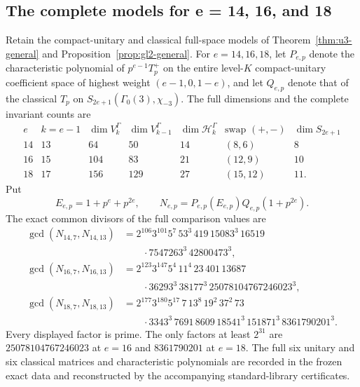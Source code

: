 \subsection{The complete models for e = 14, 16, and 18}
\label{sec:u3-higher2}

\begin{proposition}\label{prop:hecke-higher2}
Retain the compact-unitary and classical full-space models of
Theorem~\ref{thm:u3-general} and Proposition~\ref{prop:gl2-general}.
For \(e=14,16,18\), let \(P_{e,p}\) denote the characteristic polynomial
of \(p^{e-1}T_p^+\) on the entire level-\(K\) compact-unitary coefficient
space of highest weight \((e-1,0,1-e)\), and let \(Q_{e,p}\) denote that
of the classical \(T_p\) on
\(S_{2e+1}(\Gamma_0(3),\chi_{-3})\).
The full dimensions and the complete invariant counts are
\[
\begin{array}{c|c|r|r|r|c|r}
e&k=e-1&\dim V_k^\Gamma&\dim V_{k-1}^\Gamma&
\dim\mathcal H_k^\Gamma&\text{swap }(+,-)&\dim S_{2e+1}\\ \hline
14&13&64&50&14&(8,6)&8\\
16&15&104&83&21&(12,9)&10\\
18&17&156&129&27&(15,12)&11.
\end{array}
\tag{HH.1}
\]
Put
\[
 E_{e,p}=1+p^e+p^{2e},\qquad
 N_{e,p}=P_{e,p}(E_{e,p})Q_{e,p}(1+p^{2e}).
\]
The exact common divisors of the full comparison values are
\[
\begin{aligned}
\gcd(N_{14,7},N_{14,13})
 &=2^{106}3^{101}5^7\,53^3\,419\,15083^3\,16519\\
 &\qquad{}\cdot7547263^3\,42800473^3,\\
\gcd(N_{16,7},N_{16,13})
 &=2^{123}3^{147}5^4\,11^4\,23\,401\,13687\\
 &\qquad{}\cdot36293^3\,38177^3\,25078104767246023^3,\\
\gcd(N_{18,7},N_{18,13})
 &=2^{177}3^{180}5^{17}\,7\,13^8\,19^2\,37^2\,73\\
 &\qquad{}\cdot3343^3\,7691\,8609\,18541^3
                 \,151871^3\,8361790201^3.
\end{aligned}
\tag{HH.2}
\]
Every displayed factor is prime. The only factors at least \(2^{31}\)
are \(25078104767246023\) at \(e=16\) and \(8361790201\) at \(e=18\).
The full six unitary and six classical matrices and characteristic
polynomials are recorded in the frozen exact data and reconstructed
by the accompanying standard-library certificates.
\end{proposition}

